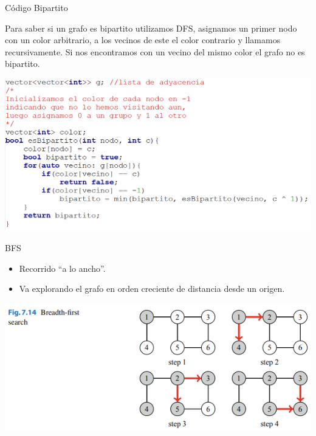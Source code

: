 \documentclass{beamer}
\begin{document}
\begin{frame}{Código Bipartito}
	\begin{flushleft}
	Para saber si un grafo es bipartito utilizamos DFS, asignamos un primer nodo con un color arbitrario, a los vecinos de este el color contrario y llamamos recursivamente. Si nos encontramos 
	con un vecino del mismo color el grafo no es bipartito.
	\end{flushleft}
	\centering
	\includegraphics[scale=0.4]{figuras/codigo-bipartito.PNG}
\end{frame}

\begin{frame}{BFS}
	\begin{itemize}
		\item Recorrido ``a lo ancho''.
		\item Va explorando el grafo en orden creciente de distancia desde un origen.
	\end{itemize}
	
	\centering
	\includegraphics[scale=0.7]{figuras/bfs_ejecucion.PNG}
\end{frame}
\end{document}
